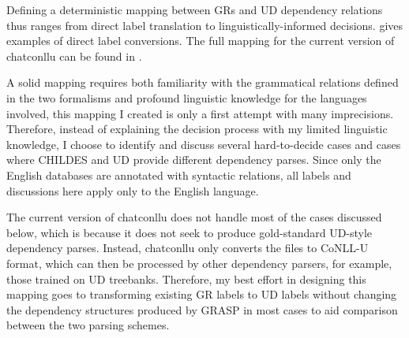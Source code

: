 Defining a deterministic mapping between GRs and UD dependency relations thus ranges from direct label translation to linguistically-informed decisions.  gives examples of direct label conversions. The full mapping for the current version of chatconllu can be found in .

 A solid mapping requires both familiarity with the grammatical relations defined in the two formalisms and profound linguistic knowledge for the languages involved, this mapping I created is only a first attempt with many imprecisions. Therefore, instead of explaining the decision process with my limited linguistic knowledge, I choose to identify and discuss several hard-to-decide cases and cases where CHILDES and UD provide different dependency parses. Since only the English databases are annotated with syntactic relations, all labels and discussions here apply only to the English language.

The current version of chatconllu does not handle most of the cases discussed below, which is because it does not seek to produce gold-standard UD-style dependency parses.  Instead, chatconllu only converts the files to CoNLL-U format, which can then be processed by other dependency parsers, for example, those trained on UD treebanks. Therefore, my best effort in designing this mapping goes to transforming existing GR labels to UD labels without changing the dependency structures produced by GRASP in most cases to aid comparison between the two parsing schemes.




